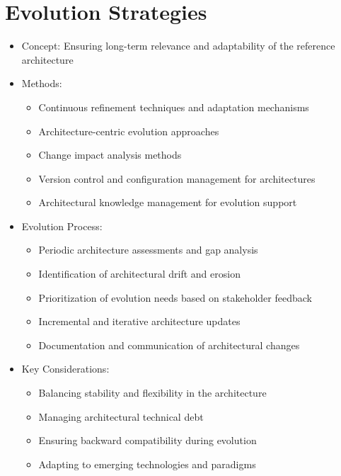 \documentclass[12pt,a4paper]{article}
\begin{document}
\section{Evolution Strategies}
\begin{itemize}
    \item Concept: Ensuring long-term relevance and adaptability of the reference architecture
    \item Methods:
    \begin{itemize}
        \item Continuous refinement techniques and adaptation mechanisms \citep{Eixelsberger1998}
        \item Architecture-centric evolution approaches \citep{Garlan2009}
        \item Change impact analysis methods \citep{Lehnert2013}
        \item Version control and configuration management for architectures \citep{Estublier2005}
        \item Architectural knowledge management for evolution support \citep{Farenhorst2007}
    \end{itemize}
    \item Evolution Process:
    \begin{itemize}
        \item Periodic architecture assessments and gap analysis \citep{Kazman2000}
        \item Identification of architectural drift and erosion \citep{Perry1992}
        \item Prioritization of evolution needs based on stakeholder feedback \citep{Bosch2004}
        \item Incremental and iterative architecture updates \citep{Mens2008}
        \item Documentation and communication of architectural changes \citep{Jansen2009}
    \end{itemize}
    \item Key Considerations:
    \begin{itemize}
        \item Balancing stability and flexibility in the architecture \citep{Ozkaya2008}
        \item Managing architectural technical debt \citep{Kruchten2012}
        \item Ensuring backward compatibility during evolution \citep{Garlan2009}
        \item Adapting to emerging technologies and paradigms \citep{Nakagawa2023}

\end{itemize}
\end{itemize}
\end{document}
